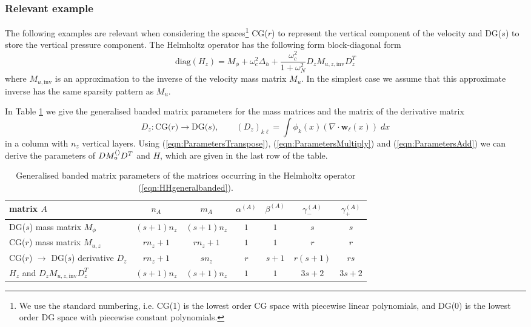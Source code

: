 \documentclass[10pt]{article}
\renewcommand{\vec}[1]{\boldsymbol{#1}}
\begin{document}
\subsubsection{Relevant example}
The following examples are relevant when considering the spaces\footnote{We use the standard numbering, i.e. CG(1) is the lowest order CG space with piecewise linear polynomials, and DG(0) is the lowest order DG space with piecewise constant polynomials.} CG($r$) to represent the vertical component of the velocity and DG($s$) to store the vertical pressure component. The Helmholtz operator has the following form block-diagonal form
\begin{equation}
  \text{diag}(H_z) = M_{\phi} + \omega_c^2\Delta_h+\frac{\omega_c^2}{1+\omega_N^2} D_z M_{u,z,\text{inv}} D_z^T
  \label{eqn:HHgeneralbanded}
\end{equation}
where $M_{u,\text{inv}}$ is an approximation to the inverse of the velocity mass matrix $M_u$. In the simplest case we assume that this approximate inverse has the same sparsity pattern as $M_u$.

In Table \ref{tab:Matrixparameters} we give the generalised banded matrix parameters for the mass matrices and the matrix of the derivative matrix
\begin{equation}
  D_z:\text{CG($r$)}\rightarrow \text{DG($s$)}, \qquad
  \left(D_z\right)_{k\ell} = \int \phi_k(x)(\nabla\cdot \vec{w}_\ell(x))\;dx
\end{equation}
in a column with $n_z$ vertical layers. Using (\ref{eqn:ParametersTranspose}), (\ref{eqn:ParametersMultiply}) and (\ref{eqn:ParametersAdd}) we can derive the parameters of $DM_u^{(\text)}D^T$ and $H$, which are given in the last row of the table.
\begin{table}
 \begin{center}
 \begin{tabular}{lcccccc}
  \hline
   matrix $A$ & $n_A$ & $m_A$ & $\alpha^{(A)}$ & $\beta^{(A)}$ & $\gamma_-^{(A)}$ & $\gamma_+^{(A)}$\\
   \hline\hline
   DG($s$) mass matrix $M_{\phi}$ & $(s+1)n_z$ & $(s+1)n_z$ & $1$ & $1$ & $s$ & $s$\\
   CG($r$) mass matrix $M_{u,z}$ & $rn_z+1$ & $rn_z+1$ & $1$ & $1$ & $r$ & $r$\\
   CG($r$) $\rightarrow$ DG($s$) derivative $D_z$ & $rn_z+1$ & $sn_z$ & $r$ & $s+1$ & $r(s+1)$ & $rs$\\
   $H_z$ and $D_zM_{u,z,\text{inv}}D_z^T$ & $(s+1)n_z$ & $(s+1)n_z$ & $1$ & $1$ & $3s+2$ & $3s+2$\\
  \hline
 \end{tabular}
 \end{center}
 \caption{Generalised banded matrix parameters of the matrices occurring in the Helmholtz operator (\ref{eqn:HHgeneralbanded}).}
 \label{tab:Matrixparameters}
\end{table}
\end{document}
